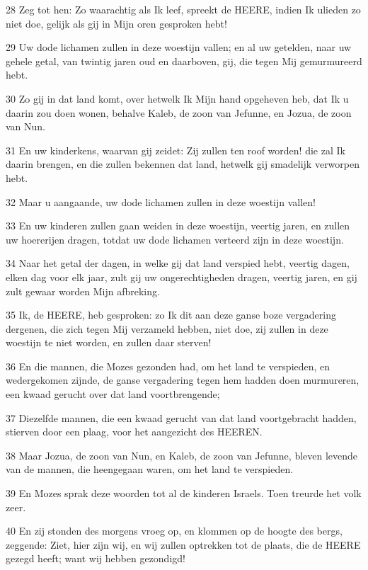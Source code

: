 \par 28 Zeg tot hen: Zo waarachtig als Ik leef, spreekt de HEERE, indien Ik ulieden zo niet doe, gelijk als gij in Mijn oren gesproken hebt!
\par 29 Uw dode lichamen zullen in deze woestijn vallen; en al uw getelden, naar uw gehele getal, van twintig jaren oud en daarboven, gij, die tegen Mij gemurmureerd hebt.
\par 30 Zo gij in dat land komt, over hetwelk Ik Mijn hand opgeheven heb, dat Ik u daarin zou doen wonen, behalve Kaleb, de zoon van Jefunne, en Jozua, de zoon van Nun.
\par 31 En uw kinderkens, waarvan gij zeidet: Zij zullen ten roof worden! die zal Ik daarin brengen, en die zullen bekennen dat land, hetwelk gij smadelijk verworpen hebt.
\par 32 Maar u aangaande, uw dode lichamen zullen in deze woestijn vallen!
\par 33 En uw kinderen zullen gaan weiden in deze woestijn, veertig jaren, en zullen uw hoererijen dragen, totdat uw dode lichamen verteerd zijn in deze woestijn.
\par 34 Naar het getal der dagen, in welke gij dat land verspied hebt, veertig dagen, elken dag voor elk jaar, zult gij uw ongerechtigheden dragen, veertig jaren, en gij zult gewaar worden Mijn afbreking.
\par 35 Ik, de HEERE, heb gesproken: zo Ik dit aan deze ganse boze vergadering dergenen, die zich tegen Mij verzameld hebben, niet doe, zij zullen in deze woestijn te niet worden, en zullen daar sterven!
\par 36 En die mannen, die Mozes gezonden had, om het land te verspieden, en wedergekomen zijnde, de ganse vergadering tegen hem hadden doen murmureren, een kwaad gerucht over dat land voortbrengende;
\par 37 Diezelfde mannen, die een kwaad gerucht van dat land voortgebracht hadden, stierven door een plaag, voor het aangezicht des HEEREN.
\par 38 Maar Jozua, de zoon van Nun, en Kaleb, de zoon van Jefunne, bleven levende van de mannen, die heengegaan waren, om het land te verspieden.
\par 39 En Mozes sprak deze woorden tot al de kinderen Israels. Toen treurde het volk zeer.
\par 40 En zij stonden des morgens vroeg op, en klommen op de hoogte des bergs, zeggende: Ziet, hier zijn wij, en wij zullen optrekken tot de plaats, die de HEERE gezegd heeft; want wij hebben gezondigd!
